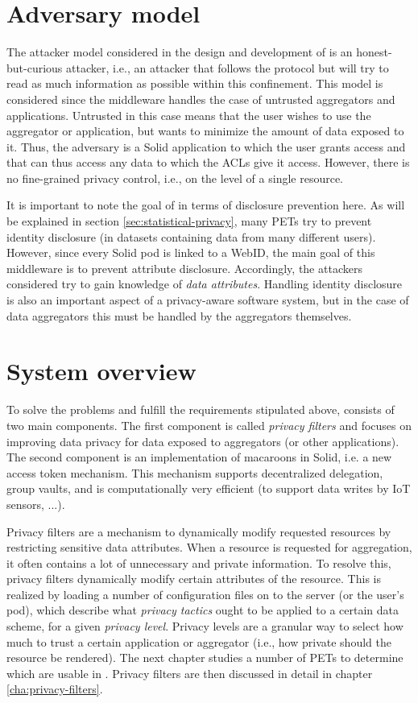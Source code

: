 \section{Adversary model}
\label{sec:attacker-model}
The attacker model considered in the design and development of \middleware{} is an honest-but-curious attacker, i.e., an attacker that follows the protocol but will try to read as much information as possible within this confinement. This model is considered since the middleware handles the case of untrusted aggregators and applications. Untrusted in this case means that the user wishes to use the aggregator or application, but wants to minimize the amount of data exposed to it. Thus, the adversary is a Solid application to which the user grants access and that can thus access any data to which the \gls{ACL}s give it access. However, there is no fine-grained privacy control, i.e., on the level of a single resource. 

It is important to note the goal of \middleware{} in terms of disclosure prevention here. As will be explained in section \ref{sec:statistical-privacy}, many \gls{PETs} try to prevent identity disclosure (in datasets containing data from many different users). However, since every Solid pod is linked to a WebID, the main goal of this middleware is to prevent attribute disclosure. Accordingly, the attackers considered try to gain knowledge of \textit{data attributes}. Handling identity disclosure is also an important aspect of a privacy-aware software system, but in the case of data aggregators this must be handled by the aggregators themselves.

\section{System overview}
To solve the problems and fulfill the requirements stipulated above, \middleware{} consists of two main components. The first component is called \textit{privacy filters} and focuses on improving data privacy for data exposed to aggregators (or other applications). The second component is an implementation of macaroons in Solid, i.e. a new access token mechanism. This mechanism supports decentralized delegation, group vaults, and is computationally very efficient (to support data writes by IoT sensors, ...).

Privacy filters are a mechanism to dynamically modify requested resources by restricting sensitive data attributes. When a resource is requested for aggregation, it often contains a lot of unnecessary and private information. To resolve this, privacy filters dynamically modify certain attributes of the resource. This is realized by loading a number of configuration files on to the server (or the user's pod), which describe what \textit{privacy tactics} ought to be applied to a certain data scheme, for a given \textit{privacy level}. Privacy levels are a granular way to select how much to trust a certain application or aggregator (i.e., how private should the resource be rendered). The next chapter studies a number of \gls{PETs} to determine which are usable in \middleware{}. Privacy filters are then discussed in detail in chapter \ref{cha:privacy-filters}. 

